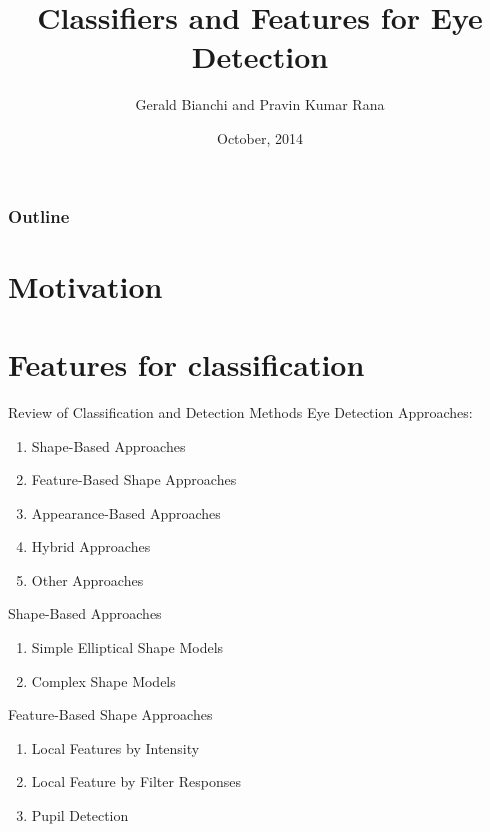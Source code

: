 \documentclass{beamer}
\title{Classifiers and Features for Eye Detection}
\author{Gerald Bianchi and Pravin Kumar Rana}%
\institute
{
{Reading Group Meeting, Algo OEM, Tobii Technology AB}
}
\date{October, 2014}
\begin{document}
{
\begin{frame}
\titlepage
\end{frame}

\begin{frame}
\frametitle{Outline}
\tableofcontents
\end{frame}

\section{Motivation}
\begin{frame}
\end{frame}

\section{Features for classification}
\begin{frame}

\end{frame}

\begin{frame}{Review of Classification and Detection Methods}
Eye Detection Approaches:
\begin{enumerate}
\item Shape-Based Approaches
\item Feature-Based Shape Approaches
\item Appearance-Based Approaches
\item Hybrid Approaches
\item Other Approaches
\end{enumerate}
\end{frame}


\begin{frame}{Shape-Based Approaches}
\begin{enumerate}
\item Simple Elliptical Shape Models
\item Complex Shape Models
\end{enumerate}
\end{frame}

\begin{frame}{Feature-Based Shape Approaches}
\begin{enumerate}
\item  Local Features by Intensity
\item Local Feature by Filter Responses
\item  Pupil Detection
\end{enumerate}
\end{frame}

}
\end{document}
